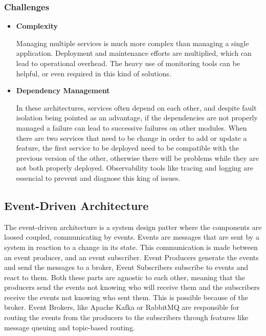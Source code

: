 \subsubsection{Challenges}
\begin{itemize}
	\item \textbf{Complexity}

	      Managing multiple services is much more complex than managing a single
	      application\cite{newman2019monolith}. Deployment and maintenance efforts are multiplied, which can
	      lead to operational overhead. The heavy use of monitoring tools can be
	      helpful, or even required in this kind of solutions.

	\item \textbf{Dependency Management}

	      In these architectures, services often depend on each other, and despite
	      fault isolation being pointed as an advantage, if the dependencies are not
	      properly managed a failure can lead to successive failures on other modules.
	      When there are two services that need to be change in order to add or update
	      a feature, the first service to be deployed need to be compatible with the
	      previous version of the other, otherwise there will be problems while they
	      are not both properly deployed.
	      Observability tools like tracing and logging are essencial to prevent and
	      diagnose this king of issues.
\end{itemize}


\subsection{Event-Driven Architecture}
The event-driven architecture is a system design patter where the components
are loosed coupled, communicating by events. Events are messages that are sent
by a system in reaction to a change in its state. This communication is made
between an event producer, and an event subscriber. Event Producers generate the
events and send the messages to a broker, Event Subscribers subscribe to
events and react to them. Both these parts are agnostic to each other, meaning
that the producers send the events not knowing who will receive them and the
subscribers receive the events not knowing who sent them. This is possible
because of the broker. Event Brokers, like Apache Kafka or RabbitMQ are
responsible for routing the events from the producers to the subscribers through
features like message queuing and topic-based routing.

